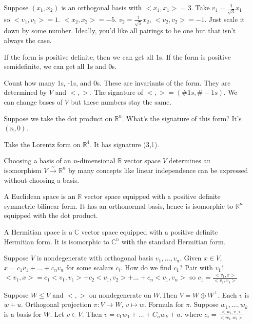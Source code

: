 \documentclass{article}
\newcommand{\C}{\mathbb{C}}
\newcommand{\R}{\mathbb{R}}
\newcommand{\ra}[1][]{\xrightarrow{#1}}
\begin{document}
\begin{example}
Suppose $(x_1,x_2)$ is an orthogonal basis with $<x_1,x_1>=3$. Take $v_1=\frac{1}{\sqrt3}x_1$ so $<v_1,v_1>=1$. $<x_2,x_2>=-5$. $v_2=\frac{1}{\sqrt5}x_2$, $<v_2,v_2>=-1$. Just scale it down by some number. Ideally, you'd like all pairings to be one but that isn't always the case.

If the form is positive definite, then we can get all 1s. If the form is positive semidefinite, we can get all 1s and 0s.
\end{example}
\begin{theorem}
Count how many 1s, -1s, and 0s. These are invariants of the form. They are determined by $V$ and $<,>$. The signature of $<,>=(\#1s,\#-1s)$. We can change bases of $V$ but these numbers stay the same.
\end{theorem}
\begin{example}
Suppose we take the dot product on $\R^n$. What's the signature of this form? It's $(n,0)$.

Take the Lorentz form on $\R^4$. It has signature (3,1).
\end{example}
Choosing a basis of an $n$-dimensional $\R$ vector space $V$ determines an isomorphism $V\ra[\sim]\R^n$ by many concepts like linear independence can be expressed without choosing a basis.
\begin{definition}
A Euclidean space is an $\R$ vector space equipped with a positive definite symmetric bilinear form. It has an orthonormal basis, hence is isomorphic to $\R^n$ equipped with the dot product.
\end{definition}
\begin{definition}
A Hermitian space is a $\C$ vector space equipped with a positive definite Hermitian form. It is isomorphic to $\C^n$ with the standard Hermitian form.
\end{definition}
Suppose $V$ is nondegenerate with orthogonal basis $v_1,...,v_n$. Given $x\in V$, $x=c_1v_1+...+c_nv_n$ for some scalars $c_i$. How do we find $c_1$? Pair with $v_1$! $<v_1,x>=c_1<v_1,v_1>+c_2<v_1,v_2>+...+c_n<v_1,v_n>$ so $c_1=\frac{<v_1,x>}{<v_1,v_1>}$
\begin{definition}
Suppose $W\leq V$ and $<,>$ on nondegenerate on $W$.Then $V=W\oplus W^\perp$. Each $v$ is $w+u$. Orthogonal projection $\pi:V\ra W$, $v\mapsto w$. Formula for $\pi$. Suppose $w_1,...,w_k$ is a basis for $W$. Let $v\in V$. Then $v=c_1w_1+...+C_nw_k+u$. where $c_i=\frac{<w_i,v>}{<w_i,w_i>}$
\end{definition}
\end{document}
